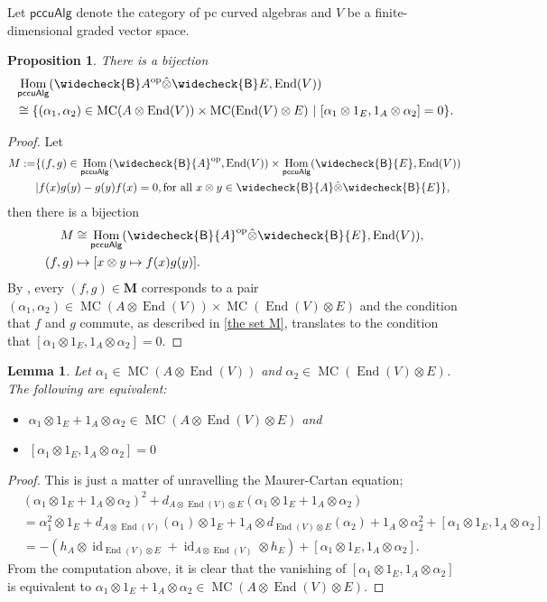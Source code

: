 \documentclass[a4paper]{amsart}
\theoremstyle{plain}
\newtheorem{prop}[thm]{Proposition}
\newtheorem{lem}[thm]{Lemma}
\theoremstyle{definition}
\theoremstyle{remark}
\DeclareMathOperator{\End}{End}
\DeclareMathOperator{\Hom}{Hom}
\DeclareMathOperator{\MC}{MC}
\newcommand{\op}{\mathrm{op}}
\newcommand{\cat}[1]{\mathsf{#1}}
\newcommand{\cB}{\widecheck{\mathsf{B}}}
\numberwithin{equation}{section}
\theoremstyle{plain}
\begin{document}
	Let $\cat{pccuAlg}$ denote the category of pc curved algebras and $V$ be a finite-dimensional graded vector space.
	\begin{prop}\label{MC-elements of bimodules}
		There is a bijection
		\begin{align*}
			&\Hom_{\cat{pccuAlg}}(\cB A^\op\hat{\otimes} \cB E,\End(V))\\
			&\cong \{(\alpha_1,\alpha_2)\in \MC(A\otimes \End(V))\times \MC(\End(V)\otimes E)\ |\ [\alpha_1\otimes 1_E,1_A\otimes \alpha_2]=0\}.
		\end{align*}
	\end{prop} 
	\begin{proof}
	Let
	\begin{align}
		\textbf{M}:=&\{(f,g)\in \Hom_{\cat{pccuAlg}}(\cB{A}^\op,\End(V))\times \Hom_{\cat{pccuAlg}}(\cB{E},\End(V))\notag \\
		&|f(x)g(y)-g(y)f(x)=0, \text{for all }x\otimes y\in \cB{A}\hat{\otimes} \cB{E} \}, \label{the set M}
	\end{align}
	then there is a bijection
		\begin{align*}
			\textbf{M}&\cong \Hom_{\cat{pccuAlg}}(\cB{A}^\op\hat{\otimes} \cB{E},\End(V)),\\
			(f,g)&\mapsto [x\otimes y\mapsto f(x)g(y)].
		\end{align*}
		By \cite[Proposition 2.6]{gl21}, every $(f,g)\in \textbf{M}$ corresponds to a pair $(\alpha_1,\alpha_2)\in \MC(A\otimes \End(V))\times \MC(\End(V)\otimes E)$ and the condition that $f$ and $g$ commute, as described in \ref{the set M}, translates to the condition that $[\alpha_1\otimes 1_E,1_A\otimes \alpha_2]=0$. 
	\end{proof}
	\begin{lem}\label{equivalent MC}
		Let $\alpha_1\in \MC(A\otimes \End(V))$ and $\alpha_2\in \MC(\End(V)\otimes E)$. 
		The following are equivalent:
		\begin{itemize}
			\item[(1)] $\alpha_1\otimes 1_E+1_A\otimes \alpha_2\in \MC(A\otimes \End(V)\otimes E)$ and
			\item[(2)] $[\alpha_1\otimes 1_E,1_A\otimes \alpha_2]=0$
		\end{itemize}
	\end{lem}
	\begin{proof}
		This is just a matter of unravelling the Maurer-Cartan equation;
		\begin{align*}
			&(\alpha_1\otimes 1_E+1_A\otimes \alpha_2)^2+d_{A\otimes \End(V)\otimes E}(\alpha_1\otimes 1_E+1_A\otimes \alpha_2)\\
			&=\alpha_1^2\otimes 1_E+d_{A\otimes \End(V)}(\alpha_1)\otimes 1_E+1_A\otimes d_{\End(V)\otimes E}(\alpha_2) +1_A \otimes \alpha_2^2
			+[\alpha_1\otimes 1_E,1_A\otimes \alpha_2]\\
			&=-(h_A\otimes \operatorname{id}_{\End(V)\otimes E}+\operatorname{id}_{A\otimes \End(V)}\otimes h_E) +[\alpha_1\otimes 1_E,1_A\otimes \alpha_2].
		\end{align*}
		From the computation above, it is clear that the vanishing of $[\alpha_1\otimes 1_E,1_A\otimes \alpha_2]$ is equivalent to $\alpha_1\otimes 1_E+1_A\otimes \alpha_2\in \MC(A\otimes \End(V)\otimes E)$.
	\end{proof}
\end{document}
